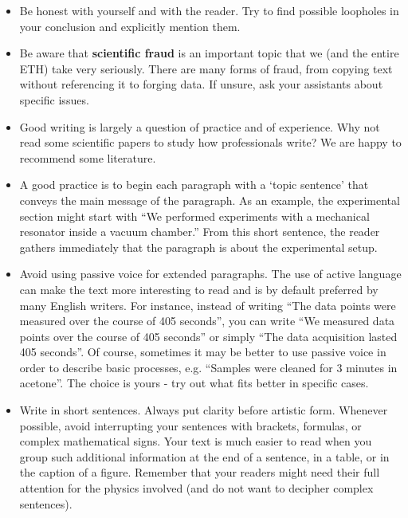 \documentclass[12pt,a4paper]{article}
\begin{document}
\begin{itemize}

\item Be honest with yourself and with the reader. Try to find possible loopholes in your conclusion and explicitly mention them.

\item Be aware that \textbf{scientific fraud} is an important topic that we (and the entire ETH) take very seriously. There are many forms of fraud, from copying text without referencing it to forging data. If unsure, ask your assistants about specific issues.

\item Good writing is largely a question of practice and of experience. Why not read some scientific papers to study how professionals write? We are happy to recommend some literature. 

\item A good practice is to begin each paragraph with a `topic sentence' that conveys the main message of the paragraph. As an example, the experimental section might start with ``We performed experiments with a mechanical resonator inside a vacuum chamber.'' From this short sentence, the reader gathers immediately that the paragraph is about the experimental setup.

\item Avoid using passive voice for extended paragraphs. The use of active language can make the text more interesting to read and is by default preferred by many English writers. For instance, instead of writing ``The data points were measured over the course of 405 seconds'', you can write ``We measured data points over the course of 405 seconds'' or simply ``The data acquisition lasted 405 seconds''. Of course, sometimes it may be better to use passive voice in order to describe basic processes, e.g. ``Samples were cleaned for 3 minutes in acetone''. The choice is yours - try out what fits better in specific cases.

\item Write in short sentences. Always put clarity before artistic form. Whenever possible, avoid interrupting your sentences with brackets, formulas, or complex mathematical signs. Your text is much easier to read when you group such additional information at the end of a sentence, in a table, or in the caption of a figure. Remember that your readers might need their full attention for the physics involved (and do not want to decipher complex sentences).


\end{itemize}
\end{document}

